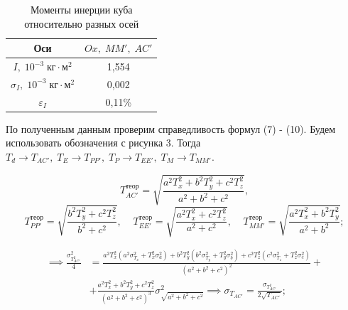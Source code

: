 \documentclass[a4paper, 12pt]{article}
\begin{document}
        \begin{table}[h]
            \centering
            \caption{Моменты инерции куба относительно разных осей}
            \begin{tabular}{|c|c|}
                \hline
                Оси
                & $Ox,\;MM',\;AC'$ \\ 
                \hline
                $I,\;10^{-3}\;кг\cdot м^2$
                & 1,554 \\ 
                \hline
                $\sigma_I,\;10^{-3}\;кг\cdot м^2$
                & 0,002 \\ 
                \hline
                $\varepsilon_I$
                & 0,11\% \\ 
                \hline
            \end{tabular}
        \end{table}

        По полученным данным проверим справедливость формул (7) - (10). Будем использовать обозначения с рисунка 3. Тогда $T_d \to T_{AC'},\;T_E \to T_{PP'},\;T_P \to T_{EE'},\; T_M \to T_{MM'}$.
        
         \begin{equation*}
            T_{AC'}^{теор} = \sqrt{\frac{a^2T_x^2+b^2T_y^2+c^2T_z^2}{a^2+b^2+c^2}},
        \end{equation*}
        \begin{equation*}
            T_{PP'}^{теор} = \sqrt{\frac{b^2T_y^2+c^2T_z^2}{b^2+c^2}},
            \;\;\;\;
            T_{EE'}^{теор} = \sqrt{\frac{a^2T_x^2+c^2T_z^2}{a^2+c^2}}, 
            \;\;\;\;
            T_{MM'}^{теор} = \sqrt{\frac{a^2T_x^2+b^2T_y^2}{a^2+b^2}};
        \end{equation*}

        \begin{equation*}
            \begin{aligned}
            \implies \frac{\sigma_{T_{AC'}^2}^2}{4} & =
            \frac{
            a^2T_x^2(a^2\sigma_{T_x}^2 + T_x^2\sigma_{a}^2) +
            b^2T_y^2(b^2\sigma_{T_y}^2 + T_y^2\sigma_{b}^2) +
            c^2T_z^2(c^2\sigma_{T_z}^2 + T_z^2\sigma_{c}^2)
            }
            {(a^2+b^2+c^2)^2} + \\
            & + 
            \frac{a^2T_x^2+b^2T_y^2+c^2T_z^2}{(a^2+b^2+c^2)^3}\sigma_{\sqrt{a^2+b^2+c^2}}^2
            \implies \sigma_{T_{AC'}} = \frac{\sigma_{T_{AC'}^2}}{2\sqrt{T_{AC'}}};
            \end{aligned}
        \end{equation*}
\end{document}
